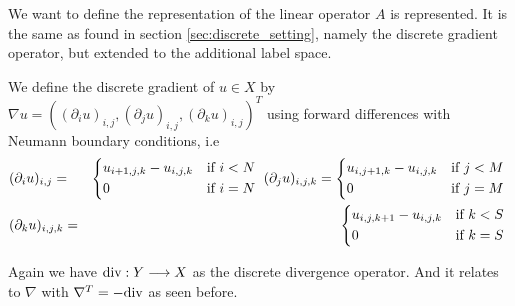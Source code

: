     We want to define  the representation of the linear operator $A$ is represented. It is the same as found in section \ref{sec:discrete_setting}, namely the discrete gradient operator, but extended to the additional label space.

    \begin{definition} %
    \label{def:discrete_gradient_operator_ms}

        We define the discrete gradient of $u \in X$ by $\nabla u = ((\partial_{i}u)_{i, j}, (\partial_{j}u)_{i, j}, (\partial_{k}u)_{i, j})^{T}$ using forward differences with Neumann boundary conditions, i.e
            \begin{eqnarray}
                &(\partial_{i}u)_{i, j} =&
                    \begin{dcases*}
                        u_{i+1, j, k} - u_{i, j, k} & \textnormal{if $i < N$} \\
                        0 & \textnormal{if $i = N$}
                    \end{dcases*}
                \notag
                (\partial_{j}u)_{i, j, k} =
                    \begin{dcases*}
                        u_{i, j+1, k} - u_{i, j, k} & \textnormal{if $j < M$} \\
                        0 & \textnormal{if $j = M$}
                    \end{dcases*}
                \notag \\
                &(\partial_{k}u)_{i, j, k} =&
                    \begin{dcases*}
                        u_{i, j, k+1} - u_{i, j, k} & \textnormal{if $k < S$} \\
                        0 & \textnormal{if $k = S$}
                    \end{dcases*}
                \notag
            \end{eqnarray}

    \end{definition}

    Again we have $\textnormal{div}: Y \longrightarrow X$ as the discrete divergence operator. And it relates to $\nabla$ with $\nabla^{T} = -\textnormal{div}$ as seen before.

